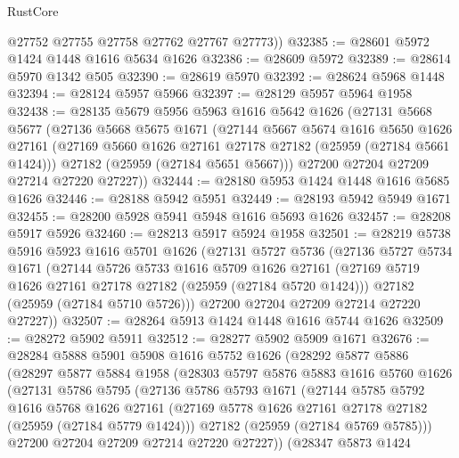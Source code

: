 \begin{lexlean}{RustCore}
\begin{coremodule}
        @27752
        @27755
        @27758
        @27762
        @27767
        @27773))
@32385 := @28601 @5972 @1424 @1448 @1616 @5634 @1626
@32386 := @28609 @5972
@32389 := @28614 @5970 @1342 @505
@32390 := @28619 @5970
@32392 := @28624 @5968 @1448
@32394 := @28124 @5957 @5966
@32397 := @28129 @5957 @5964 @1958
@32438 := @28135
    @5679
    @5956
    @5963
    @1616
    @5642
    @1626
    (@27131
      @5668
      @5677
      (@27136
        @5668
        @5675
        @1671
        (@27144
          @5667
          @5674
          @1616
          @5650
          @1626
          @27161
          (@27169 @5660 @1626 @27161 @27178 @27182 (@25959 (@27184 @5661 @1424)))
          @27182
          (@25959 (@27184 @5651 @5667)))
        @27200
        @27204
        @27209
        @27214
        @27220
        @27227))
@32444 := @28180 @5953 @1424 @1448 @1616 @5685 @1626
@32446 := @28188 @5942 @5951
@32449 := @28193 @5942 @5949 @1671
@32455 := @28200 @5928 @5941 @5948 @1616 @5693 @1626
@32457 := @28208 @5917 @5926
@32460 := @28213 @5917 @5924 @1958
@32501 := @28219
    @5738
    @5916
    @5923
    @1616
    @5701
    @1626
    (@27131
      @5727
      @5736
      (@27136
        @5727
        @5734
        @1671
        (@27144
          @5726
          @5733
          @1616
          @5709
          @1626
          @27161
          (@27169 @5719 @1626 @27161 @27178 @27182 (@25959 (@27184 @5720 @1424)))
          @27182
          (@25959 (@27184 @5710 @5726)))
        @27200
        @27204
        @27209
        @27214
        @27220
        @27227))
@32507 := @28264 @5913 @1424 @1448 @1616 @5744 @1626
@32509 := @28272 @5902 @5911
@32512 := @28277 @5902 @5909 @1671
@32676 := @28284
    @5888
    @5901
    @5908
    @1616
    @5752
    @1626
    (@28292
      @5877
      @5886
      (@28297
        @5877
        @5884
        @1958
        (@28303
          @5797
          @5876
          @5883
          @1616
          @5760
          @1626
          (@27131
            @5786
            @5795
            (@27136
              @5786
              @5793
              @1671
              (@27144
                @5785
                @5792
                @1616
                @5768
                @1626
                @27161
                (@27169 @5778 @1626 @27161 @27178 @27182 (@25959 (@27184 @5779 @1424)))
                @27182
                (@25959 (@27184 @5769 @5785)))
              @27200
              @27204
              @27209
              @27214
              @27220
              @27227))
          (@28347
            @5873
            @1424

\end{coremodule}
\end{lexlean}
